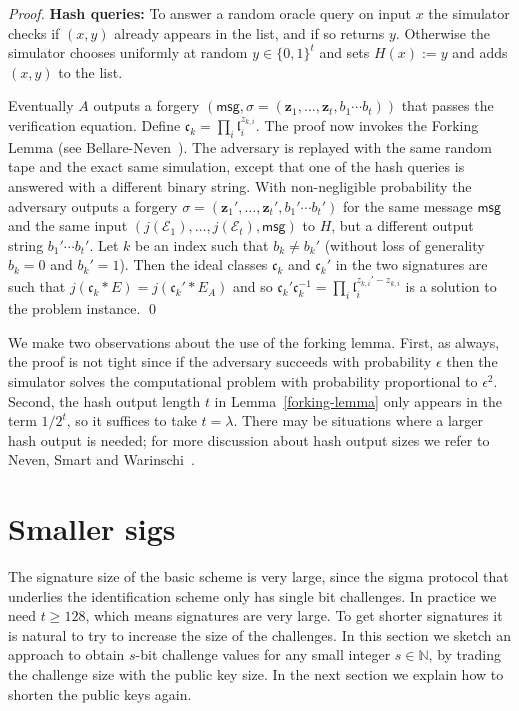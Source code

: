 \documentclass{llncs}
\newcommand{\E}{\mathcal{E}}
\newcommand{\N}{\mathbb{N}}
\newcommand{\msg}{\mathsf{msg}}
\renewcommand{\c}{\mathfrak{c}}
\renewcommand{\l}{\mathfrak{l}}
\newcommand{\z}{\mathbf{z}}
\begin{document}
\begin{proof}
\vskip 0.1cm

\noindent \textbf{Hash queries:}
To answer a random oracle query on input $x$ the simulator checks if $(x,y)$ already appears in the list, and if so returns $y$. Otherwise the simulator chooses uniformly at random $y \in \{0,1\}^t$ and sets $H(x) := y$ and adds $(x,y)$ to the list.

\vskip 0.1cm

Eventually $A$ outputs a forgery $(\msg, \sigma = (\z_1, \dots, \z_t, b_1\cdots b_t))$ that passes the verification equation.
Define $\c_k = \prod_i \l_i^{z_{k,i}}$.
The proof now invokes the Forking Lemma (see Bellare-Neven~\cite{BN06}). The adversary is replayed with the same random tape and the exact same simulation, except that one of the hash queries is answered with a different binary string.
With non-negligible probability the adversary outputs a forgery $\sigma = (\z_1', \dots, \z_t', b_1'\cdots b_t')$ for the same message $\msg$ and the same input $(j(\E_1), \dots, j(\E_t), \msg)$ to $H$, but a different output string $b_1'\cdots b_t'$. Let $k$ be an index such that $b_k \ne b_k'$ (without loss of generality $b_k = 0$ and $b_k' = 1$). Then the ideal classes $\c_k$ and $\c_k'$ in the two signatures are such that $j( \c_k * E ) = j( \c_k' * E_A )$ and so $\c_k' \c_k^{-1} = \prod_i \l_i^{z_{k,i}' - z_{k,i}}$ is a solution to the problem instance. \qed
\end{proof}


We make two observations about the use of the forking lemma.
First, as always, the proof is not tight since if the adversary succeeds with probability $\epsilon$ then the simulator solves the computational problem with probability proportional to $\epsilon^2$.
Second, the hash output length $t$ in Lemma~\ref{forking-lemma} only appears in the term $1/2^t$, so it suffices to take $t = \lambda$.
There may be situations where a larger hash output is needed; for more discussion about hash output sizes we refer to Neven, Smart and Warinschi~\cite{NSW09}.





\section{Smaller sigs}\label{sec:smaller-sigs}


The signature size of the basic scheme is very large, since the sigma protocol that underlies the identification scheme only has single bit challenges. 
In practice we need $t \ge 128$, which means signatures are very large.
To get shorter signatures it is natural to try to increase the size of the challenges.
In this section we sketch an approach to obtain $s$-bit challenge values for any small integer $s \in \N$, by trading the challenge size with the public key size. In the next section we explain how to shorten the public keys again.
\end{document}
